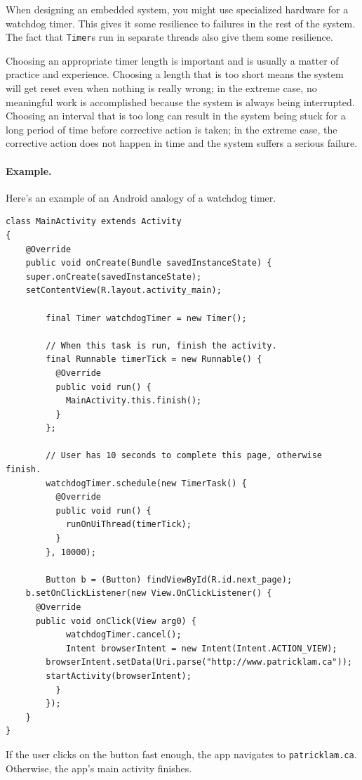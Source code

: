 When designing an embedded system, you might use specialized hardware
for a watchdog timer. This gives it some resilience to failures in the
rest of the system. The fact that {\tt Timer}s run in separate threads
also give them some resilience.

Choosing an appropriate timer length is important and is usually a matter of practice and experience. Choosing a length that is too short means the system will get reset even when nothing is really wrong; in the extreme case, no meaningful work is accomplished because the system is always being interrupted. Choosing an interval that is too long can result in the system being stuck for a long period of time before corrective action is taken; in the extreme case, the corrective action does not happen in time and the system suffers a serious failure.

\paragraph{Example.}
Here's an example of an Android analogy of a watchdog timer.

{\scriptsize \begin{lstlisting}
class MainActivity extends Activity
{
    @Override
    public void onCreate(Bundle savedInstanceState) {
	super.onCreate(savedInstanceState);
	setContentView(R.layout.activity_main);

        final Timer watchdogTimer = new Timer();

        // When this task is run, finish the activity.
        final Runnable timerTick = new Runnable() {
          @Override 
          public void run() {
            MainActivity.this.finish();
          }
        };

        // User has 10 seconds to complete this page, otherwise finish.
        watchdogTimer.schedule(new TimerTask() {
          @Override
          public void run() {
            runOnUiThread(timerTick);
          }
        }, 10000);

        Button b = (Button) findViewById(R.id.next_page);
	b.setOnClickListener(new View.OnClickListener() {
	  @Override
	  public void onClick(View arg0) {
            watchdogTimer.cancel();
            Intent browserIntent = new Intent(Intent.ACTION_VIEW);
	    browserIntent.setData(Uri.parse("http://www.patricklam.ca"));
	    startActivity(browserIntent);
          }
        });
    }
}
\end{lstlisting}}

If the user clicks on the button fast enough,
the app navigates to \texttt{patricklam.ca}. Otherwise, the app's main activity finishes.

